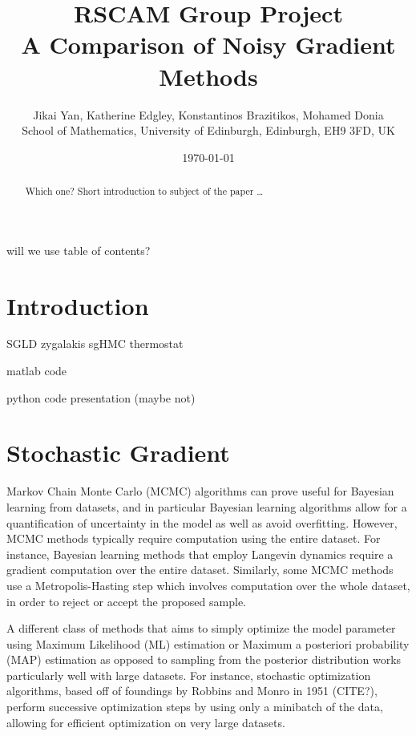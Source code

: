\documentclass[11pt]{article}
\title{RSCAM Group Project\\[2ex]
\bf A Comparison of Noisy Gradient Methods%
}
\author{Jikai Yan,
Katherine Edgley,
Konstantinos Brazitikos,
Mohamed Donia\\[1ex]
School of Mathematics, University of Edinburgh, Edinburgh, EH9 3FD, UK}
\date{\today}
\begin{document}
\maketitle
\begin{abstract} Which one?
\lipsum[3] Short introduction to subject of the paper \ldots 
\end{abstract}

will we use table of contents?
\tableofcontents

\section{Introduction}
SGLD\cite{Welling:2011:BLV:3104482.3104568}
zygalakis\cite{JMLR:v17:15-494}
sgHMC\cite{Chen:2014:SGH:3044805.3045080}
thermostat\cite{doi:10.1137/15M102318X}

matlab code \cite{matlab}

python code \cite{python}
presentation \cite{presentation}
(maybe not)


\section{Stochastic Gradient}

Markov Chain Monte Carlo (MCMC) algorithms can prove useful for Bayesian learning from datasets, and in particular Bayesian learning algorithms allow for a quantification of uncertainty in the model as well as avoid overfitting. However, MCMC methods typically require computation using the entire dataset. For instance, Bayesian learning methods that employ Langevin dynamics require a gradient computation over the entire dataset. Similarly, some MCMC methods use a Metropolis-Hasting step which involves computation over the whole dataset, in order to reject or accept the proposed sample. \par
A different class of methods that aims to simply optimize the model parameter using Maximum Likelihood (ML) estimation or Maximum a posteriori probability (MAP) estimation as opposed to sampling from the posterior distribution works particularly well with large datasets. For instance, stochastic optimization algorithms, based off of foundings by Robbins and Monro in 1951 (CITE?), perform successive optimization steps by using only a minibatch of the data, allowing for efficient optimization on very large datasets. \par
\end{document}
